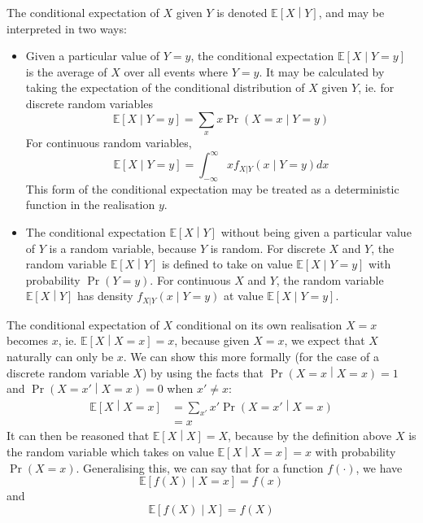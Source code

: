 \documentclass[11pt]{report} %
\begin{document}
The conditional expectation of $X$ given $Y$ is denoted $\mathbb{E}\left[X\middle|Y\right]$, and may be interpreted in two ways:
\begin{itemize}
\item Given a particular value of $Y = y$, the conditional expectation $\mathbb{E}\left[X\middle|Y = y\right]$ is the average of $X$ over all events where $Y = y$. It may be calculated by taking the expectation of the conditional distribution of $X$ given $Y$, ie. for discrete random variables
\begin{equation}
\mathbb{E}\left[X\middle|Y = y\right] = \sum_{x}x\operatorname{Pr}\left(X = x\middle|Y = y\right)
\end{equation}
For continuous random variables,
\begin{equation}
\mathbb{E}\left[X\middle|Y = y\right] = \int_{-\infty}^{\infty}xf_{X|Y}\left(x\middle|Y = y\right)dx
\end{equation}
This form of the conditional expectation may be treated as a deterministic function in the realisation $y$.
\item The conditional expectation $\mathbb{E}\left[X\middle|Y\right]$ without being given a particular value of $Y$ is a random variable, because $Y$ is random. For discrete $X$ and $Y$, the random variable $\mathbb{E}\left[X\middle|Y\right]$ is defined to take on value $\mathbb{E}\left[X\middle|Y = y\right]$ with probability $\operatorname{Pr}\left(Y = y\right)$. For continuous $X$ and $Y$, the random variable $\mathbb{E}\left[X\middle|Y\right]$ has density $f_{X|Y}\left(x\middle|Y = y\right)$ at value $\mathbb{E}\left[X\middle|Y = y\right]$.
\end{itemize}
The conditional expectation of $X$ conditional on its own realisation $X = x$ becomes $x$, ie. $\mathbb{E}\left[X\middle|X = x\right] = x$, because given $X = x$, we expect that $X$ naturally can only be $x$. We can show this more formally (for the case of a discrete random variable $X$) by using the facts that $\operatorname{Pr}\left(X = x \middle| X = x\right) = 1$ and $\operatorname{Pr}\left(X = x' \middle| X = x\right) = 0$ when $x' \neq x$:
\begin{align}
\mathbb{E}\left[X\middle|X = x\right] &= \sum_{x'}x'\operatorname{Pr}\left(X = x' \middle| X = x\right) \\
&= x
\end{align}
It can then be reasoned that $\mathbb{E}\left[X\middle|X\right] = X$, because by the definition above $X$ is the random variable which takes on value $\mathbb{E}\left[X\middle|X = x\right] = x$ with probability $\operatorname{Pr}\left(X = x\right)$. Generalising this, we can say that for a function $f\left(\cdot\right)$, we have
\begin{equation}
\mathbb{E}\left[f\left(X\right)\middle|X = x\right] = f\left(x\right)
\end{equation}
and
\begin{equation}
\mathbb{E}\left[f\left(X\right)\middle|X\right] = f\left(X\right)
\end{equation}
\end{document}
